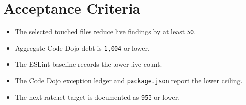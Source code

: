 \section{Acceptance Criteria}\label{record-235-acceptance-criteria}

\begin{itemize}
\tightlist
\item
  The selected touched files reduce live findings by at least \texttt{5\allowbreak{}0}.
\item
  Aggregate Code Dojo debt is \texttt{1\allowbreak{},\allowbreak{}0\allowbreak{}0\allowbreak{}4} or lower.
\item
  The ESLint baseline records the lower live count.
\item
  The Code Dojo exception ledger and \texttt{p\allowbreak{}a\allowbreak{}c\allowbreak{}k\allowbreak{}a\allowbreak{}g\allowbreak{}e\allowbreak{}.\allowbreak{}j\allowbreak{}s\allowbreak{}o\allowbreak{}n} report the lower ceiling.
\item
  The next ratchet target is documented as \texttt{9\allowbreak{}5\allowbreak{}3} or lower.
\end{itemize}


